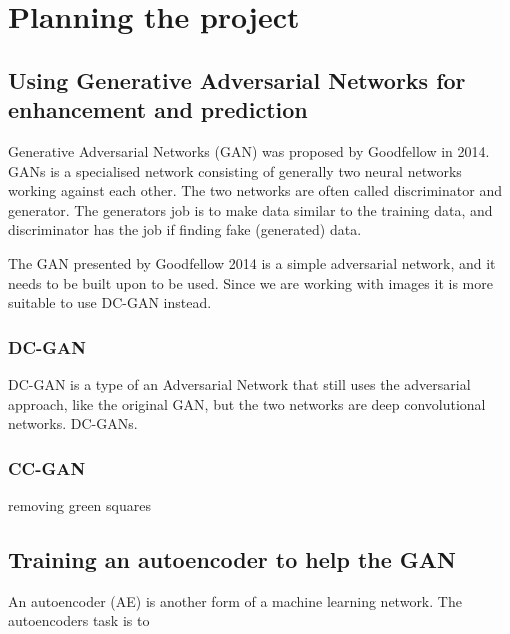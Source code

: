 
\chapter{Planning the project}
\section{Using Generative Adversarial Networks for enhancement and prediction}
Generative Adversarial Networks (GAN) was proposed by Goodfellow in 2014. \cite{GoodfellowGAN} %
GANs is a specialised network consisting of generally two neural networks working against each other. 
The two networks are often called discriminator and generator. The generators job is to make data similar to the training data, and discriminator has the job if finding fake (generated) data.

The GAN presented by Goodfellow 2014\cite{GoodfellowGAN} is a simple adversarial network, and it needs to be built upon to be used. Since we are working with images it is more suitable to use
DC-GAN instead. 

\subsection{DC-GAN}
  DC-GAN is a type of an Adversarial Network that still uses the adversarial approach, like the original GAN, but the two networks are deep convolutional networks. DC-GANs.
\subsection{CC-GAN}
  removing green squares

\section{Training an autoencoder to help the GAN}
An autoencoder (AE) is another form of a machine learning network. The autoencoders task is to  
